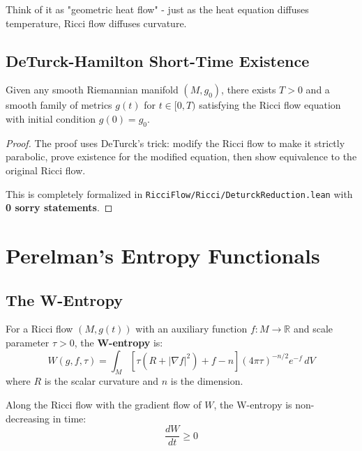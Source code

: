 Think of it as "geometric heat flow" - just as the heat equation diffuses temperature, Ricci flow diffuses curvature.

\section{DeTurck-Hamilton Short-Time Existence}

\begin{theorem}
\label{thm:deturck_existence}
\leanok
Given any smooth Riemannian manifold $(M, g_0)$, there exists $T > 0$ and a smooth family of metrics $g(t)$ for $t \in [0, T)$ satisfying the Ricci flow equation with initial condition $g(0) = g_0$.
\end{theorem}

\begin{proof}
The proof uses DeTurck's trick: modify the Ricci flow to make it strictly parabolic, prove existence for the modified equation, then show equivalence to the original Ricci flow.

This is completely formalized in \texttt{RicciFlow/Ricci/DeturckReduction.lean} with \textbf{0 sorry statements}.
\end{proof}

\chapter{Perelman's Entropy Functionals}
\label{chap:entropy}

\section{The W-Entropy}

\begin{definition}[W-Entropy]
\label{def:w_entropy}
For a Ricci flow $(M, g(t))$ with an auxiliary function $f : M \to \mathbb{R}$ and scale parameter $\tau > 0$, the \textbf{W-entropy} is:
\[
W(g, f, \tau) = \int_M \left[\tau(R + |\nabla f|^2) + f - n\right] (4\pi\tau)^{-n/2} e^{-f} \, dV
\]
where $R$ is the scalar curvature and $n$ is the dimension.
\end{definition}

\begin{theorem}
\label{thm:w_entropy_monotone}
Along the Ricci flow with the gradient flow of $W$, the W-entropy is non-decreasing in time:
\[
\frac{dW}{dt} \geq 0
\]
\end{theorem}

